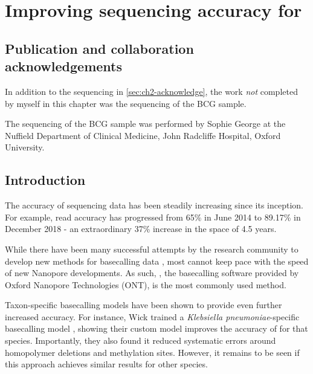 \chapter{Improving \ont{} sequencing accuracy for \mtb{}}
\label{chap:tubby}

\setcounter{section}{-1}
\section{Publication and collaboration acknowledgements}
\label{sec:ch4-acknowledge}

In addition to the sequencing in \autoref{sec:ch2-acknowledge}, the work \emph{not} completed by myself in this chapter was the sequencing of the BCG sample. 

The \ont{} sequencing of the BCG sample was performed by Sophie George at the Nuffield Department of Clinical Medicine, John Radcliffe Hospital, Oxford University.

\section{Introduction}
The accuracy of \ont{} sequencing data has been steadily increasing since its inception. For example, read accuracy has progressed from 65\% in June 2014 \cite{Loman2015} to 89.17\% in December 2018 \cite{wick2019} - an extraordinary 37\% increase in the space of 4.5 years. 

While there have been many successful attempts by the research community to develop new methods for basecalling \ont{} data \cite{chiron2018,Stoiber2017,Boza2020}, most cannot keep pace with the speed of new Nanopore developments. As such, \guppy{}, the basecalling software provided by Oxford Nanopore Technologies (ONT), is the most commonly used method.

Taxon-specific \ont{} basecalling models have been shown to provide even further increased accuracy. For instance, Wick \etal{} trained a \textit{Klebsiella pneumoniae}-specific basecalling model \cite{wick2019}, showing their custom model improves the accuracy of \ont{} for that species. Importantly, they also found it reduced systematic errors around homopolymer deletions and methylation sites. However, it remains to be seen if this approach achieves similar results for other species.


